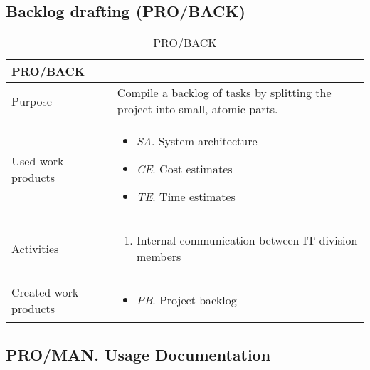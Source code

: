 \subsection{Backlog drafting (PRO/BACK)}
\begin{table}[h!]
\begin{tabular}{l|p{}}
\hline
\textbf{PRO/BACK}        & \textbf{} \\ \hline
Purpose & Compile a backlog of tasks by splitting the project into small, atomic parts.  \\ \hline
Used work products    &      
\begin{itemize}
    \item \textit{SA}. System architecture
    \item \textit{CE}. Cost estimates
    \item \textit{TE}. Time estimates
\end{itemize}
\\ \hline
Activities            &   
\begin{enumerate}
    \item Internal communication between IT division members
\end{enumerate}
\\ \hline
Created work products &     
\begin{itemize}
    \item \textit{PB}. Project backlog
\end{itemize}
\end{tabular}
\caption{PRO/BACK}
\label{pro/back}
\end{table}

\subsection{PRO/MAN. Usage Documentation}

